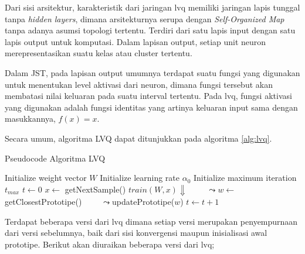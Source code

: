 Dari sisi arsitektur, karakteristik dari jaringan \gls{lvq} memiliki jaringan
lapis tunggal tanpa \textit{hidden layers}, dimana arsitekturnya serupa dengan
\textit{Self-Organized Map} tanpa adanya asumsi topologi tertentu. Terdiri dari
satu lapis input dengan satu lapis output untuk komputasi. Dalam lapisan output,
setiap unit neuron merepresentasikan suatu kelas atau cluster tertentu.

Dalam JST, pada lapisan output umumnya terdapat suatu fungsi yang digunakan
untuk menentukan level aktivasi dari neuron, dimana fungsi tersebut akan
membatasi nilai keluaran pada suatu interval tertentu. Pada \gls{lvq}, fungsi
aktivasi yang digunakan adalah fungsi identitas yang artinya keluaran input sama
dengan masukkannya, $f(x) = x$.

\noindent
Secara umum, algoritma LVQ dapat ditunjukkan pada algoritma \ref{alg:lvq}.

\begin{algorithm}  
\scriptsize 
\caption{Pseudocode Algoritma LVQ}          
\label{alg:lvq}                           
\begin{algorithmic}                    %
	\STATE Initialize weight vector $W$
	\STATE Initialize learning rate $\alpha_0$
	\STATE Initialize maximum iteration $t_{max}$
	\STATE $t \leftarrow 0$
		\STATE $x \leftarrow $ getNextSample()
		\STATE $train(W, x) \Downarrow$
		\STATE $\qquad \leadsto w \leftarrow $ getClosestPrototipe()
		\STATE $\qquad \leadsto $updatePrototipe($w$)
		\STATE $t \leftarrow t + 1$
	\ENDWHILE
\end{algorithmic}
\end{algorithm}
 
Terdapat beberapa versi dari \gls{lvq} dimana setiap versi merupakan
penyempurnaan dari versi sebelumnya, baik dari sisi konvergensi 
maupun inisialisasi awal prototipe. Berikut akan diuraikan beberapa versi
dari \gls{lvq};

